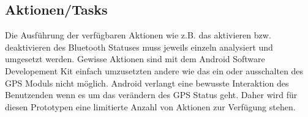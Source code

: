 \subsection{Aktionen/Tasks}
Die Ausführung der verfügbaren Aktionen wie z.B. das aktivieren bzw. deaktivieren des Bluetooth Statuses muss jeweils einzeln analysiert und umgesetzt werden. Gewisse Aktionen sind mit dem Android Software Developement Kit einfach umzusetzten andere wie das ein oder ausschalten des GPS Moduls nicht möglich. Android verlangt eine bewusste Interaktion des Benutzenden wenn es um das verändern des GPS Status geht. Daher wird für diesen Prototypen eine limitierte Anzahl von Aktionen zur Verfügung stehen.